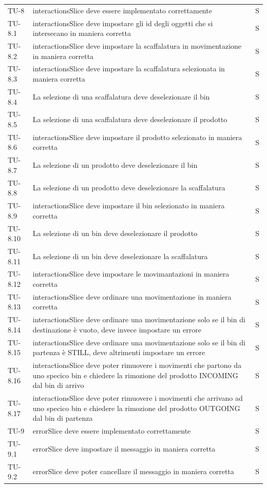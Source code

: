 \begin{xltabular}{0.9\textwidth}{X | p{0.6\textwidth} | p{0.1\textwidth} }
    TU-8 & interactionsSlice deve essere implementato correttamente & S\\
    TU-8.1 & interactionsSlice deve impostare gli id degli oggetti che si intersecano in maniera corretta & S\\
    TU-8.2 & interactionsSlice deve impostare la scaffalatura in movimentazione in maniera corretta & S\\
    TU-8.3 & interactionsSlice deve impostare la scaffalatura selezionata in maniera corretta & S\\
    TU-8.4 & La selezione di una scaffalatura deve deselezionare il bin & S\\
    TU-8.5 & La selezione di una scaffalatura deve deselezionare il prodotto & S\\
    TU-8.6 & interactionsSlice deve impostare il prodotto selezionato in maniera corretta & S\\
    TU-8.7 & La selezione di un prodotto deve deselezionare il bin & S\\
    TU-8.8 & La selezione di un prodotto deve deselezionare la scaffalatura & S\\
    TU-8.9 & interactionsSlice deve impostare il bin selezionato in maniera corretta & S\\
    TU-8.10 & La selezione di un bin deve deselezionare il prodotto & S\\
    TU-8.11 & La selezione di un bin deve deselezionare la scaffalatura & S\\
    TU-8.12 & interactionsSlice deve impostare le movimantazioni in maniera corretta & S\\
    TU-8.13 & interactionsSlice deve ordinare una movimentazione in maniera corretta & S\\
    TU-8.14 & interactionsSlice deve ordinare una movimentazione solo se il bin di destinazione è vuoto, deve invece impostare un errore & S\\
    TU-8.15 & interactionsSlice deve ordinare una movimentazione solo se il bin di partenza è STILL, deve altrimenti impostare un errore & S\\
    TU-8.16 & interactionsSlice deve poter rimuovere i movimenti che partono da uno specico bin e chiedere la rimozione del prodotto INCOMING dal bin di arrivo & S\\
    TU-8.17 & interactionsSlice deve poter rimuovere i movimenti che arrivano ad uno specico bin e chiedere la rimozione del prodotto OUTGOING dal bin di partenza & S\\
   
    TU-9 & errorSlice deve essere implementato correttamente & S\\
    TU-9.1 & errorSlice deve impostare il messaggio in maniera corretta & S\\
    TU-9.2 & errorSlice deve poter cancellare il messaggio in maniera corretta & S\\
\end{xltabular}

